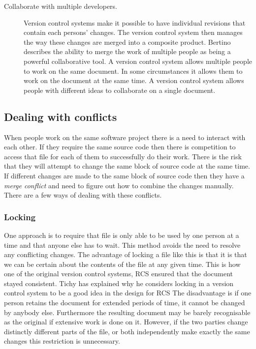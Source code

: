 \begin{description}
  \item [Collaborate with multiple developers.]
  Version control systems make it possible to have individual revisions that contain each persons' changes. The version control system then manages the way these changes are merged into a composite product. Bertino \cite{Bertino2012} describes the ability to merge the work of multiple people as being a powerful collaborative tool. A version control system allows multiple people to work on the same document. In some circumstances it allows them to work on the document at the same time.  A version control system allows people with different ideas to collaborate on a single document.


\end{description}



\subsection{Dealing with conflicts}
When people work on the same software project there is a need to interact with each other.
If they require the same source code then there is competition to access that file for each of them to successfully do their work.
There is the risk that they will attempt to change the same block of source code at the same time.
If different changes are made to the same block of source code then they have a \emph{merge conflict} and need to figure out how to combine the changes manually.
There are a few ways of dealing with these conflicts.

\subsubsection{Locking}
One approach is to require that file is only able to be used by one person at a time and that anyone else has to wait. This method avoids the need to resolve any conflicting changes.  The advantage of locking a file like this is that it is that we can be certain about the contents of the file at any given time. This is how one of the original version control systems, RCS ensured that the document stayed consistent. Tichy has explained why he considers locking in a version control system to be a good idea in the design for RCS\cite{Tichy1982} The disadvantage is if one person retains the document for extended periods of time, it cannot be changed by anybody else. Furthermore the resulting document may be barely recognisable as the original if extensive work is done on it. However, if the two parties change distinctly different parts of the file, or both independently make exactly the same changes this restriction is unnecessary. 
